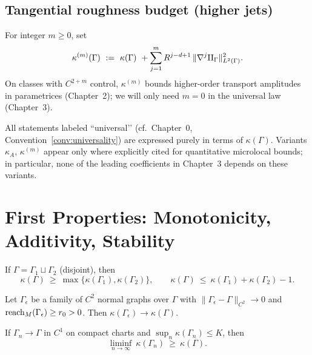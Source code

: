 \subsection{Tangential roughness budget (higher jets)}
For integer $m\ge 0$, set
\[
\kappa^{(m)}(\Gamma)\ :=\ \kappa(\Gamma)\ +\sum_{j=1}^m R^{j-d+1}\,\|\nabla^j \II_\Gamma\|_{L^2(\Gamma)}^2.
\]
On classes with $C^{2+m}$ control, $\kappa^{(m)}$ bounds higher-order transport amplitudes in parametrices (Chapter~2); we will only need $m=0$ in the universal law (Chapter~3).

\begin{remark}
All statements labeled “universal’’ (cf.\ Chapter~0, Convention~\ref{conv:universality}) are expressed purely in terms of $\kappa(\Gamma)$. Variants $\kappa_A$, $\kappa^{(m)}$ appear only where explicitly cited for quantitative microlocal bounds; in particular, none of the leading coefficients in Chapter~3 depends on these variants.
\end{remark}

\bigskip

\section{First Properties: Monotonicity, Additivity, Stability}
\label{sec:properties}

\begin{proposition}
\label{prop:mono}
If $\Gamma=\Gamma_1\sqcup\Gamma_2$ (disjoint), then
\[
\kappa(\Gamma)\ \ge\ \max\{\kappa(\Gamma_1),\kappa(\Gamma_2)\},\qquad
\kappa(\Gamma)\ \le\ \kappa(\Gamma_1)+\kappa(\Gamma_2)-1.
\]
\end{proposition}

\begin{proposition}
\label{prop:stability}
Let $\Gamma_\epsilon$ be a family of $C^2$ normal graphs over $\Gamma$ with $\|\Gamma_\epsilon-\Gamma\|_{C^2}\to 0$ and $\operatorname{reach}_M(\Gamma_\epsilon)\ge r_0>0$. Then $\kappa(\Gamma_\epsilon)\to \kappa(\Gamma)$.
\end{proposition}

\begin{proposition}
\label{prop:lsc}
If $\Gamma_n\to \Gamma$ in $C^1$ on compact charts and $\sup_n \kappa(\Gamma_n)\le K$, then
\[
\liminf_{n\to\infty}\ \kappa(\Gamma_n)\ \ge\ \kappa(\Gamma).
\]
\end{proposition}

